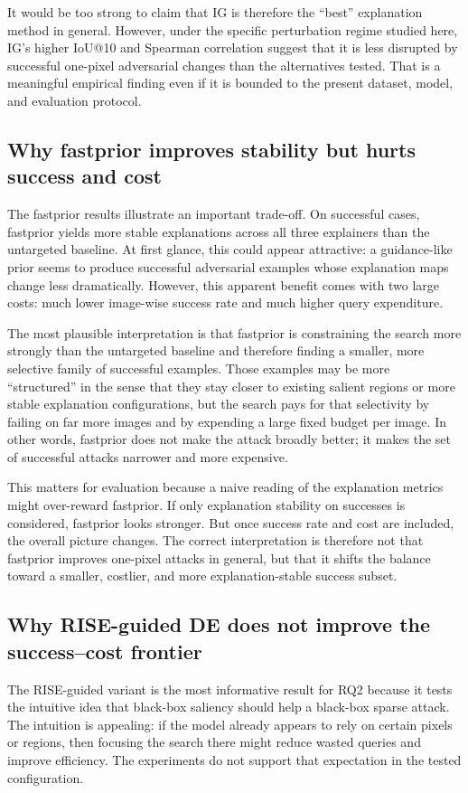 It would be too strong to claim that IG is therefore the ``best'' explanation method in general.
However, under the specific perturbation regime studied here, IG's higher IoU@10 and Spearman correlation suggest that it is less disrupted by successful one-pixel adversarial changes than the alternatives tested.
That is a meaningful empirical finding even if it is bounded to the present dataset, model, and evaluation protocol.

\subsection{Why fastprior improves stability but hurts success and cost}
The fastprior results illustrate an important trade-off.
On successful cases, fastprior yields more stable explanations across all three explainers than the untargeted baseline.
At first glance, this could appear attractive: a guidance-like prior seems to produce successful adversarial examples whose explanation maps change less dramatically.
However, this apparent benefit comes with two large costs: much lower image-wise success rate and much higher query expenditure.

The most plausible interpretation is that fastprior is constraining the search more strongly than the untargeted baseline and therefore finding a smaller, more selective family of successful examples.
Those examples may be more ``structured'' in the sense that they stay closer to existing salient regions or more stable explanation configurations, but the search pays for that selectivity by failing on far more images and by expending a large fixed budget per image.
In other words, fastprior does not make the attack broadly better; it makes the set of successful attacks narrower and more expensive.

This matters for evaluation because a naive reading of the explanation metrics might over-reward fastprior.
If only explanation stability on successes is considered, fastprior looks stronger.
But once success rate and cost are included, the overall picture changes.
The correct interpretation is therefore not that fastprior improves one-pixel attacks in general, but that it shifts the balance toward a smaller, costlier, and more explanation-stable success subset.

\subsection{Why RISE-guided DE does not improve the success--cost frontier}
The RISE-guided variant is the most informative result for RQ2 because it tests the intuitive idea that black-box saliency should help a black-box sparse attack.
The intuition is appealing: if the model already appears to rely on certain pixels or regions, then focusing the search there might reduce wasted queries and improve efficiency.
The experiments do not support that expectation in the tested configuration.

